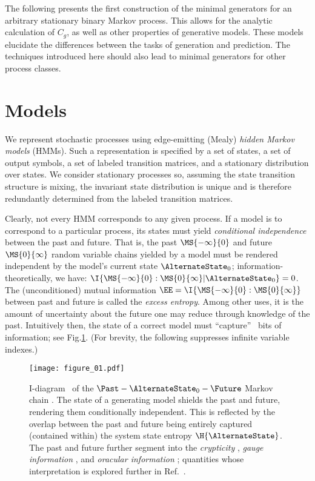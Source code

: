 \documentclass[final,nofootinbib,aps,pre,twocolumn,showpacs,groupaddress,preprintnumbers,floatfix]{revtex4-1}
\newcommand{\Cg}{\ensuremath{C_g}\xspace}
\begin{document}
The following presents the first construction of the minimal generators for an
arbitrary stationary binary Markov process. This allows for the analytic
calculation of \Cg, as well as other properties of generative models. These
models elucidate the differences between the tasks of generation and
prediction. The techniques introduced here should also lead to minimal
generators for other process classes.

\section{Models}
\label{sec:models}

We represent stochastic processes using edge-emitting (Mealy) \emph{hidden
Markov models} (HMMs). Such a representation is specified by a set of states, a
set of output symbols, a set of labeled transition matrices, and a stationary
distribution over states. We consider stationary processes so, assuming the
state transition structure is mixing, the invariant state distribution is
unique and is therefore redundantly determined from the labeled transition
matrices.

Clearly, not every HMM corresponds to any given process. If a model is to
correspond to a particular process, its states must yield \emph{conditional
independence} between the past and future. That is, the past $\MS{-\infty}{0}$
and future $\MS{0}{\infty}$ random variable chains yielded by a model must be
rendered independent by the model's current state $\AlternateState_0$;
information-theoretically, we have: $\I{\MS{-\infty}{0}: \MS{0}{\infty} |
\AlternateState_0} = 0$. The (unconditioned) mutual information $\EE =
\I{\MS{-\infty}{0} : \MS{0}{\infty}}$ between past and future is called the
\emph{excess entropy}. Among other uses, it is the amount of uncertainty about
the future one may reduce through knowledge of the past. Intuitively then, the
state of a correct model must ``capture'' \EE\ bits of information; see
Fig.\nobreakspace \ref {fig:correct_model}. (For brevity, the following suppresses infinite
variable indexes.)

\begin{figure}
\centering
\texttt{[image: figure\_01.pdf]}
 \caption{I-diagram~\cite{Yeun91a} of the $\Past - \AlternateState_0 - \Future$
	Markov chain \cite{Cove06a}. The state of a generating model shields the
	past and future, rendering them conditionally independent. This is
	reflected by the overlap \EE between the past and future being entirely
	captured (contained within) the system state entropy $\H{\AlternateState}$.
	The past and future further segment \AlternateState into the
	\emph{crypticity} \PC, \emph{gauge information} \GI, and \emph{oracular
	information} \OI; quantities whose interpretation is explored further in
	Ref.~\cite{Crut10a}.
  }
  \label{fig:correct_model}
\end{figure}
\end{document}
